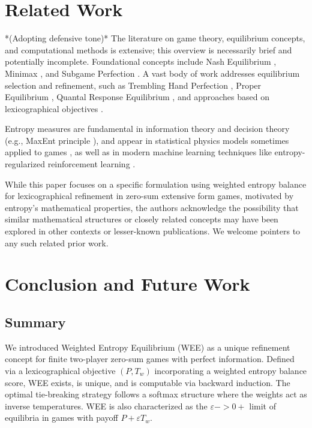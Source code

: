 \documentclass{article}
\begin{document}
\section{Related Work}
*(Adopting defensive tone)*
The literature on game theory, equilibrium concepts, and computational methods is extensive; this overview is necessarily brief and potentially incomplete. Foundational concepts include Nash Equilibrium \cite{placeholder_nash}, Minimax \cite{placeholder_vonneumann}, and Subgame Perfection \cite{placeholder_selten_spe}. A vast body of work addresses equilibrium selection and refinement, such as Trembling Hand Perfection \cite{placeholder_selten_thpe}, Proper Equilibrium \cite{placeholder_myerson}, Quantal Response Equilibrium \cite{placeholder_qre}, and approaches based on lexicographical objectives \cite{placeholder_lexico_games}.

Entropy measures are fundamental in information theory \cite{placeholder_cover_thomas} and decision theory (e.g., MaxEnt principle \cite{placeholder_jaynes}), and appear in statistical physics models sometimes applied to games \cite{placeholder_statphys_games}, as well as in modern machine learning techniques like entropy-regularized reinforcement learning \cite{placeholder_entropy_rl}.

While this paper focuses on a specific formulation using weighted entropy balance for lexicographical refinement in zero-sum extensive form games, motivated by entropy's mathematical properties, the authors acknowledge the possibility that similar mathematical structures or closely related concepts may have been explored in other contexts or lesser-known publications. We welcome pointers to any such related prior work.

\section{Conclusion and Future Work}

\subsection{Summary}
We introduced Weighted Entropy Equilibrium (WEE) as a unique refinement concept for finite two-player zero-sum games with perfect information. Defined via a lexicographical objective $(P, T_w)$ incorporating a weighted entropy balance score, WEE exists, is unique, and is computable via backward induction. The optimal tie-breaking strategy follows a softmax structure where the weights act as inverse temperatures. WEE is also characterized as the $\varepsilon -> 0+$ limit of equilibria in games with payoff $P + \varepsilon T_w$.
\end{document}
